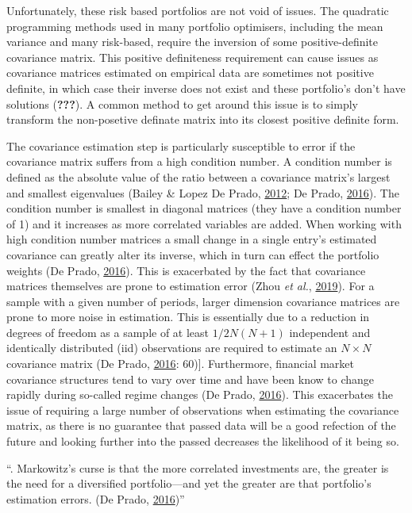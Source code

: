 \documentclass[11pt,preprint, authoryear]{elsarticle}
\numberwithin{equation}{section}
\numberwithin{figure}{section}
\numberwithin{table}{section}
\begin{document}
Unfortunately, these risk based portfolios are not void of issues. The
quadratic programming methods used in many portfolio optimisers,
including the mean variance and many risk-based, require the inversion
of some positive-definite covariance matrix. This positive definiteness
requirement can cause issues as covariance matrices estimated on
empirical data are sometimes not positive definite, in which case their
inverse does not exist and these portfolio's don't have solutions
({\textbf{???}}). A common method to get around this issue is to simply
transform the non-posetive definate matrix into its closest positive
definite form.

The covariance estimation step is particularly susceptible to error if
the covariance matrix suffers from a high condition number. A condition
number is defined as the absolute value of the ratio between a
covariance matrix's largest and smallest eigenvalues (Bailey \& Lopez De
Prado, \protect\hyperlink{ref-lopez2012}{2012}; De Prado,
\protect\hyperlink{ref-lopez}{2016}). The condition number is smallest
in diagonal matrices (they have a condition number of 1) and it
increases as more correlated variables are added. When working with high
condition number matrices a small change in a single entry's estimated
covariance can greatly alter its inverse, which in turn can effect the
portfolio weights (De Prado, \protect\hyperlink{ref-lopez}{2016}). This
is exacerbated by the fact that covariance matrices themselves are prone
to estimation error (Zhou \emph{et al.},
\protect\hyperlink{ref-zhou2019}{2019}). For a sample with a given
number of periods, larger dimension covariance matrices are prone to
more noise in estimation. This is essentially due to a reduction in
degrees of freedom as a sample of at least \(1/2N(N+1)\) independent and
identically distributed (iid) observations are required to estimate an
\(N\times N\) covariance matrix (De Prado,
\protect\hyperlink{ref-lopez}{2016}: 60){]}. Furthermore, financial
market covariance structures tend to vary over time and have been know
to change rapidly during so-called regime changes (De Prado,
\protect\hyperlink{ref-lopez}{2016}). This exacerbates the issue of
requiring a large number of observations when estimating the covariance
matrix, as there is no guarantee that passed data will be a good
refection of the future and looking further into the passed decreases
the likelihood of it being so.

``. Markowitz's curse is that the more correlated investments are, the
greater is the need for a diversified portfolio---and yet the greater
are that portfolio's estimation errors. (De Prado,
\protect\hyperlink{ref-lopez}{2016})''
\end{document}
